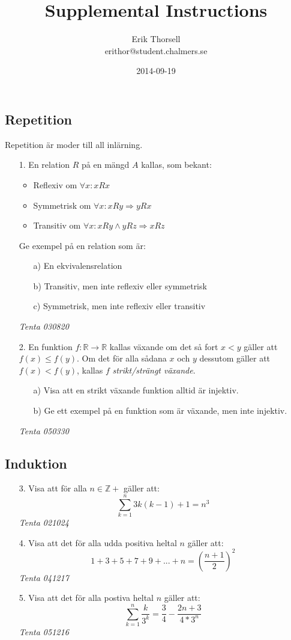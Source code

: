 \documentclass{article}
\title{Supplemental Instructions}
\author{Erik Thorsell \\ 
		\small{erithor@student.chalmers.se}
}
\date{2014-09-19}
\begin{document}
\maketitle

\subsection*{Repetition}
Repetition är moder till all inlärning.
\begin{enumerate}

\item[1.]
En relation $R$ på en mängd $A$ kallas, som bekant:
\begin{itemize}
\item Reflexiv om $\forall x : xRx$
\item Symmetrisk om $\forall x : xRy \Rightarrow yRx$
\item Transitiv om $\forall x : xRy \wedge yRz \Rightarrow xRz$
\end{itemize}
Ge exempel på en relation som är:
\begin{itemize}
\item[a)] En ekvivalensrelation
\item[b)] Transitiv, men inte reflexiv eller symmetrisk
\item[c)] Symmetrisk, men inte reflexiv eller transitiv
\end{itemize}
{\it Tenta 030820}

\item[2.]
En funktion $f : \mathbb{R} \rightarrow \mathbb{R}$ kallas växande om det så fort 
$x < y$ gäller att $f(x) \leq f(y)$. Om det för alla sådana $x$ och $y$ dessutom 
gäller att $f(x) < f(y)$, kallas $f$ {\it strikt/strängt växande}.
\begin{itemize}
\item[a)] Visa att en strikt växande funktion alltid är injektiv.
\item[b)] Ge ett exempel på en funktion som är växande, men inte injektiv.
\end{itemize}
{\it Tenta 050330}

\end{enumerate}

\subsection*{Induktion}
\begin{enumerate}
\item[3.] 
Visa att för alla $n \in \mathbb{Z+}$ gäller att: 
\[\sum\limits_{k=1}^{n} 3k(k-1)+1=n^3\] 
{\it Tenta 021024}

\item[4.]
Visa att det för alla udda positiva heltal $n$ gäller att:
\[1+3+5+7+9+...+n=(\frac{n+1}{2})^2\] 
{\it Tenta 041217}

\item[5.]
Visa att det för alla postiva heltal $n$ gäller att:
\[\sum\limits_{k=1}^{n} \frac{k}{3^k}=\frac{3}{4}-\frac{2n+3}{4*3^n}\]
{\it Tenta 051216}
\end{enumerate}
\end{document}

